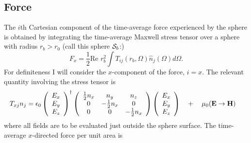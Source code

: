 \documentclass[letterpaper]{article}
\begin{document}
\subsection*{Force}

The $i$th Cartesian component of the time-average
force experienced by the sphere is obtained by integrating the 
time-average Maxwell stress tensor over a sphere with 
radius $r_b>r_0$ (call this sphere $\mathcal{S}_b$:)
\begin{equation}
F_x=\frac{1}{2}\text{Re }r_b^2 \int T_{ij}(r_b,\Omega) \hat{n}_j(\Omega) d\Omega.
\end{equation}
For definiteness I will consider the $x$-component of the force, $i=x$.
The relevant quantity involving the stress tensor is 
\begin{align*}
 T_{xj}n_j 
&=
\epsilon_0\left(\begin{array}{c} E_x \\ E_y \\ E_z \end{array}\right)^\dagger
          \left(\begin{array}{ccc} 
                 \frac{1}{2}n_x & n_y              & n_z \\
                 0              & -\frac{1}{2}n_x  & 0   \\ 
                 0              & 0                & -\frac{1}{2}n_x
                \end{array}
          \right)
          \left(\begin{array}{c} E_x \\ E_y \\ E_z \end{array}\right)
\quad+\quad \mu_0(\mathbf{E} \to \mathbf{H})
\end{align*}
where all fields are to be evaluated just outside the sphere
surface.
The time-average $x$-directed force per unit area is 
\end{document}
